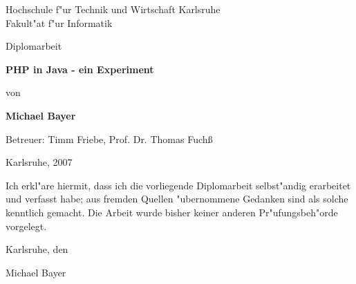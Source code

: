 

\pagestyle{empty}
\sffamily

\noindent
\begin{center}
    \Large
    Hochschule f"ur Technik und Wirtschaft Karlsruhe\\
    Fakult"at f"ur Informatik\\
\end{center}

\vfill\vfill
\begin{center}
    \large
    Diplomarbeit\\
\end{center}

\vfill
\begin{center}
    \Huge\bfseries
    PHP in Java - ein Experiment
\end{center}

\vfill
\begin{center}
    \Large
    von 
\end{center}

\vfill
\begin{center}
    \huge\bfseries
    Michael Bayer
\end{center}

\vfill\vfill\vfill
\begin{center}
    \Large
    Betreuer: Timm Friebe,  Prof. Dr. Thomas Fuch\ss
\end{center}

\vfill
\begin{center}
\large
    Karlsruhe, 2007
\end{center}

\cleardoublepage

\pagestyle{empty}
Ich erkl"are hiermit, dass ich die vorliegende Diplomarbeit 
selbst"andig erarbeitet und verfasst habe; aus fremden Quellen 
"ubernommene Gedanken sind als solche kenntlich gemacht. Die Arbeit 
wurde bisher keiner anderen Pr"ufungsbeh"orde vorgelegt. 

\vspace{1cm}
Karlsruhe, den 

\vspace{2cm}
\hfill Michael Bayer

\cleardoublepage





\cleardoublepage

\pagestyle{headings}
\tableofcontents

